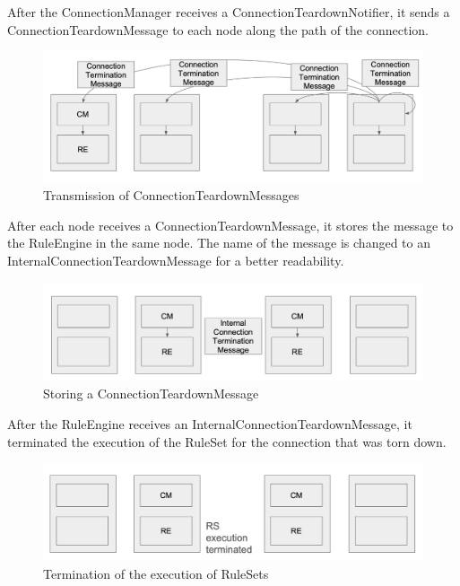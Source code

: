 After the ConnectionManager receives a ConnectionTeardownNotifier, it sends a ConnectionTeardownMessage to each node along the path of the connection.

\begin{figure}[H]
  \centerline{\includegraphics[width=\columnwidth]{images/connection_teardown_message.png}}
  \caption{Transmission of ConnectionTeardownMessages}
\end{figure}

After each node receives a ConnectionTeardownMessage, it stores the message to the RuleEngine in the same node.
The name of the message is changed to an InternalConnectionTeardownMessage for a better readability.

\begin{figure}[H]
  \centerline{\includegraphics[width=0.7\columnwidth]{images/internal_connection_teardown_message.png}}
  \caption{Storing a ConnectionTeardownMessage}
\end{figure}

After the RuleEngine receives an InternalConnectionTeardownMessage, it terminated the execution of the RuleSet for the connection that was torn down.

\begin{figure}[H]
  \centerline{\includegraphics[width=\columnwidth]{images/ruleset_execution_terminated.png}}
  \caption{Termination of the execution of RuleSets}
\end{figure}

